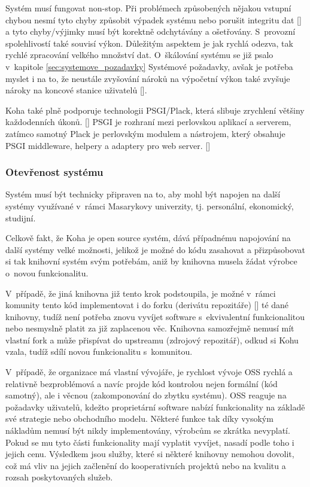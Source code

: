\documentclass[
	11pt, oneside, printed, final, palatino, monochrome
	microtype,
	table,   %
	lof,     %
	lot     %
]{fithesis3}
\newcommand{\citepages}[2]{[\cite[#1]{#2}]}
\newcommand{\citesource}[1]{[\cite{#1}]}
\begin{document}
{Systém musí fungovat non-stop. Při problémech způsobených nějakou vstupní chybou nesmí tyto chyby způsobit výpadek systému nebo porušit integritu dat \citepages{2}{bartosek_2001_systemovy_pohled} a tyto chyby/výjimky musí být korektně odchytávány a ošetřovány. S~provozní spolehlivostí také souvisí výkon. Důležitým aspektem je jak rychlá odezva, tak rychlé zpracování velkého množství dat. O~škálování systému se již psalo v~kapitole \ref{sec:systemove_pozadavky} Systémové požadavky, avšak je potřeba myslet i na to, že neustále zvyšování nároků na výpočetní výkon také zvyšuje nároky na koncové stanice uživatelů \citepages{2-3}{bartosek_2001_systemovy_pohled}.

Koha také plně podporuje technologii PSGI/Plack, která slibuje zrychlení většiny každodenních úkonů. \citesource{koha_3.22_released_2016}
 PSGI je rozhraní mezi perlovskou aplikací a serverem, zatímco samotný Plack je perlovským modulem a nástrojem, který obsahuje PSGI middleware, helpery a adaptery pro web server.  \citesource{psgi/plack_2016}

\subsubsection{Otevřenost systému}
Systém musí být technicky připraven na to, aby mohl být napojen na další systémy využívané v~rámci Masarykovy univerzity, tj. personální, ekonomický, studijní.

Celkově fakt, že Koha je open source systém, dává případnému napojování na další systémy velké možnosti, jelikož je možné do kódu zasahovat a přizpůsobovat si tak knihovní systém svým potřebám, aniž by knihovna musela žádat výrobce o~novou funkcionalitu.

V~případě, že jiná knihovna již tento krok podstoupila, je možné v~rámci komunity tento kód  implementovat i do forku (derivátu repozitáře) \citepages{29}{Chaconc2009} té dané knihovny, tudíž není potřeba znovu vyvíjet software s~ekvivalentní funkcionalitou nebo nesmyslně platit za již zaplacenou věc. Knihovna samozřejmě nemusí mít vlastní fork a může přispívat do upstreamu (zdrojový repozitář), odkud si Kohu vzala, tudíž sdílí novou funkcionalitu s~komunitou.

V~případě, že organizace má vlastní vývojáře, je rychlost vývoje OSS rychlá a relativně bezproblémová a navíc projde kód kontrolou nejen formální (kód samotný), ale i věcnou (zakomponování do zbytku systému). OSS reaguje na požadavky uživatelů, kdežto proprietární software nabízí funkcionality na základě své strategie nebo obchodního modelu. Některé funkce tak díky vysokým nákladům nemusí být nikdy implementovány, výrobcům se zkrátka nevyplatí. Pokud se mu tyto části funkcionality mají vyplatit vyvíjet, nasadí podle toho i jejich cenu. Výsledkem jsou služby, které si některé knihovny nemohou dovolit, což má vliv na jejich začlenění do kooperativních projektů nebo na kvalitu a rozsah poskytovaných služeb.

}
\end{document}
